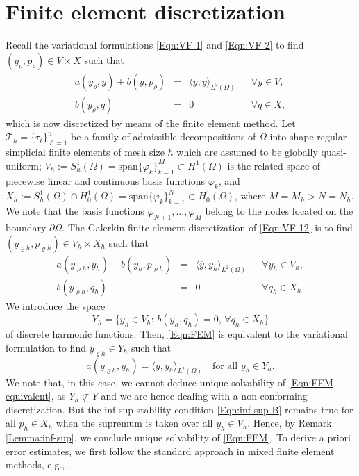 \documentclass{article}
\numberwithin{equation}{section}
\begin{document}
\section{Finite element discretization}\label{Sec:FED}
Recall the variational formulations \eqref{Eqn:VF 1} and \eqref{Eqn:VF 2}
to find $(y_\varrho,p_\varrho) \in V \times X$ such that
\begin{equation}\label{Eqn:VF 12}
  \begin{array}{lclcl}
    a(y_\varrho,y) + b(y,p_\varrho)
    & = & \langle \overline{y},y \rangle_{L^2(\Omega)}
    && \forall y \in V, \\[1mm]
    b(y_\varrho,q) & = & 0 & & \forall q \in X,
  \end{array}
\end{equation}
which is now discretized by means of the finite element method.
Let ${\mathcal{T}}_h = \{ \tau_\ell \}_{\ell=1}^n$ be a family of admissible
decompositions of $\Omega$ into shape regular simplicial finite elements
of mesh size $h$ which are assumed to be globally quasi-uniform;
$V_h := S_h^1(\Omega) = \mbox{span} \{ \varphi_k \}_{k=1}^M \subset H^1(\Omega)$
is the related space of piecewise linear and continuous basis functions
$\varphi_k$, and $X_h := S_h^1(\Omega) \cap H^1_0(\Omega) =
\mbox{span} \{ \varphi_k \}_{k=1}^N \subset H_0^1(\Omega)$,
where $M=M_h > N=N_h$.
We note that the basis functions $\varphi_{N+1},\ldots,\varphi_M$ belong to
the nodes located on the boundary $\partial \Omega$.
The Galerkin finite element discretization of \eqref{Eqn:VF 12}
is to find $(y_{\varrho h},p_{\varrho h}) \in V_h \times X_h$ such that
%
\begin{equation}\label{Eqn:FEM}
  \begin{array}{lclcl}
    a(y_{\varrho h},y_h) + b(y_h,p_{\varrho h})
    & = & \langle \overline{y},y_h \rangle_{L^2(\Omega)}
    && \forall y_h \in V_h, \\[1mm]
    b(y_{\varrho h},q_h) & = & 0 & & \forall q_h \in X_h.
  \end{array}
\end{equation}
We introduce the space 
\begin{equation*}
 Y_h = \Big \{ y_h \in V_h:\, b(y_h,q_h)=0,\, \forall q_h\in X_h\Big\}
\end{equation*}
of discrete harmonic functions.
Then, \eqref{Eqn:FEM} is equivalent to the variational formulation to
find $y_{\varrho h}\in Y_h$ such that  
\begin{equation}\label{Eqn:FEM equivalent}
  a(y_{\varrho h},y_h) =
  \langle \overline{y},y_h \rangle_{L^2(\Omega)}
  \quad \text{for all } y_h\in Y_h. 
\end{equation}
We note that, in this case, we cannot deduce unique solvability of
\eqref{Eqn:FEM equivalent}, as $Y_h \not \subset Y$ and we are hence
dealing with a non-conforming discretization. But the inf-sup stability
condition \eqref{Eqn:inf-sup B} remains true for all $p_h \in X_h$ when the
supremum is taken over all $y_h \in V_h$. Hence, by
Remark \ref{Lemma:inf-sup}, we conclude unique solvability of \eqref{Eqn:FEM}.
To derive a priori error estimates, we first follow the standard
approach in mixed finite element methods, e.g.,
\cite[Theorem 7.4.3]{QuarteroniValli1994Book}.
\end{document}
